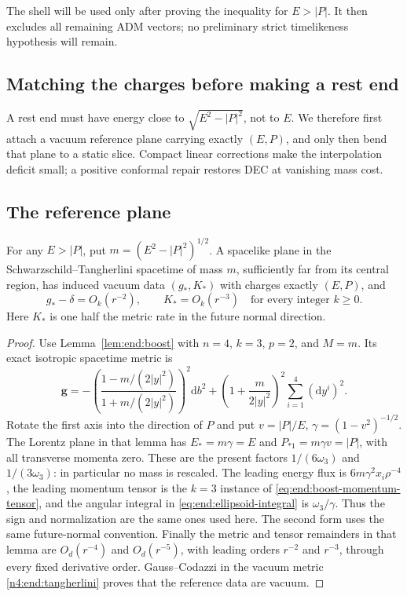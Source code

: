 The shell will be used only after proving the inequality for
\(E>|P|\). It then excludes all remaining ADM vectors; no preliminary
strict timelikeness hypothesis will remain.

\subsection{Matching the charges before making a rest end}

A rest end must have energy close to $\sqrt{E^2-|P|^2}$, not to $E$.
We therefore first attach a vacuum reference plane carrying exactly
$(E,P)$, and only then bend that plane to a static slice. Compact
linear corrections make the interpolation deficit small; a positive
conformal repair restores DEC at vanishing mass cost.

\subsection*{The reference plane}

\begin{lemma}\label{n4:end:boosted-plane}
For any \(E>|P|\), put \(m=(E^2-|P|^2)^{1/2}\). A spacelike plane
in the Schwarzschild--Tangherlini spacetime of mass \(m\), sufficiently
far from its central region, has induced vacuum data \((g_*,K_*)\)
with charges exactly \((E,P)\), and
\[
 g_*-\delta=O_k(r^{-2}),\qquad K_*=O_k(r^{-3})
 \quad\text{for every integer }k\ge0.
\]
Here \(K_*\) is one half the metric rate in the future normal direction.
\end{lemma}

\begin{proof}
Use Lemma~\ref{lem:end:boost} with $n=4$, $k=3$, $p=2$, and
$M=m$. Its exact isotropic spacetime metric is
\begin{equation}\label{n4:end:tangherlini}
 \mathbf g=-\left(\frac{1-m/(2|y|^2)}{1+m/(2|y|^2)}\right)^2\mathrm db^2
       +\left(1+\frac{m}{2|y|^2}\right)^2\sum_{i=1}^4(\mathrm dy^i)^2.
\end{equation}
Rotate the first axis into the direction of $P$ and put $v=|P|/E$,
$\gamma=(1-v^2)^{-1/2}$. The Lorentz plane in that lemma has
\(E_*=m\gamma=E\) and \(P_{*1}=m\gamma v=|P|\), with all transverse
momenta zero. These are the present factors $1/(6\omega_3)$ and
$1/(3\omega_3)$: in particular no mass is rescaled. The leading energy
flux is $6m\gamma^2 x_i\rho^{-4}$, the leading momentum tensor is
the $k=3$ instance of \eqref{eq:end:boost-momentum-tensor}, and the
angular integral in \eqref{eq:end:ellipsoid-integral} is
$\omega_3/\gamma$. Thus the sign and normalization are the same
ones used here. The second form uses the same future-normal convention.
Finally the metric and tensor remainders in that lemma are
$O_d(r^{-4})$ and $O_d(r^{-5})$, with leading orders $r^{-2}$ and
$r^{-3}$, through every fixed derivative order. Gauss--Codazzi in the
vacuum metric \eqref{n4:end:tangherlini} proves that the reference data
are vacuum.
\end{proof}

